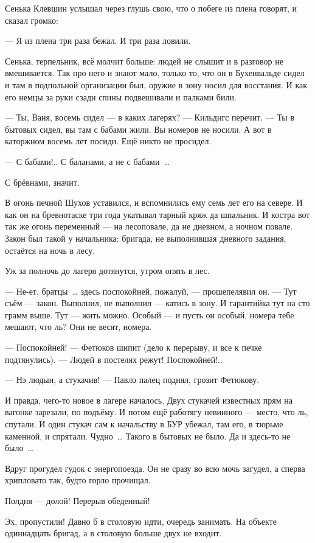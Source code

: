 Сенька Клевшин услышал через глушь свою, что о побеге из плена говорят, и сказал громко:

--- Я из плена три раза бежал. И три раза ловили.

Сенька, терпельник, всё молчит больше: людей не слышит и в разговор не вмешивается. Так про 
него и знают мало, только то, что он в Бухенвальде сидел и там в подпольной организации был, 
оружие в зону носил для восстания. И как его немцы за руки сзади спины подвешивали и палками 
били.

--- Ты, Ваня, восемь сидел --- в каких лагерях? --- Кильдигс перечит. --- Ты в бытовых сидел, вы там с 
бабами жили. Вы номеров не носили. А вот в каторжном восемь лет посиди. Ещё никто не просидел.

--- С бабами!.. С баланами, а не с бабами~\dots{}

С брёвнами, значит.

В огонь печной Шухов уставился, и вспомнились ему семь лет его на севере. И как он на 
бревнотаске три года укатывал тарный кряж да шпальник. И костра вот так же огонь переменный 
--- на лесоповале, да не дневном, а ночном повале. Закон был такой у начальника: бригада, не 
выполнившая дневного задания, остаётся на ночь в лесу.

Уж за полночь до лагеря дотянутся, утром опять в лес.

--- Не-ет, братцы~\dots{} здесь поспокойней, пожалуй, --- прошепелявил он. --- Тут съём --- закон. 
Выполнил, не выполнил --- катись в зону. И гарантийка тут на сто грамм выше. Тут --- жить можно. 
Особый --- и пусть он особый, номера тебе мешают, что ль? Они не весят, номера.

--- Поспокойней! --- Фетюков шипит (дело к перерыву, и все к печке подтянулись). --- Людей в 
постелях режут! Поспокойней!..

--- Нэ людын, а стукачив! --- Павло палец поднял, грозит Фетюкову.

И правда, чего-то новое в лагере началось. Двух стукачей известных прям на вагонке зарезали, 
по подъёму. И потом ещё работягу невинного --- место, что ль, спутали. И один стукач сам к 
начальству в БУР убежал, там его, в тюрьме каменной, и спрятали. Чудно~\dots{} Такого в бытовых не 
было. Да и здесь-то не было~\dots{}

Вдруг прогудел гудок с энергопоезда. Он не сразу во всю мочь загудел, а сперва хрипловато 
так, будто горло прочищал.

Полдня --- долой! Перерыв обеденный!

Эх, пропустили! Давно б в столовую идти, очередь занимать. На объекте одиннадцать бригад, а в 
столовую больше двух не входит.

